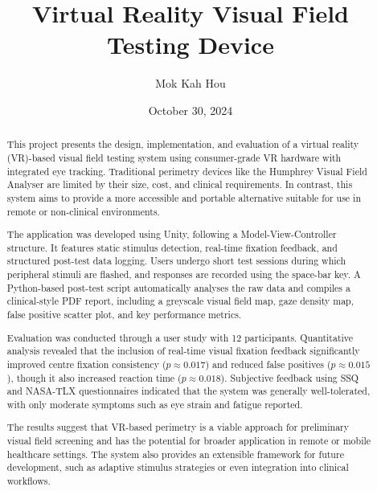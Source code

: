 \documentclass{l4proj}
\begin{document}
\title{Virtual Reality Visual Field Testing Device} %
\author{Mok Kah Hou}
\date{October 30, 2024}

\maketitle

\begin{abstract}
    This project presents the design, implementation, and evaluation of a virtual reality (VR)-based visual field testing system using consumer-grade VR hardware with integrated eye tracking. Traditional perimetry devices like the Humphrey Visual Field Analyser are limited by their size, cost, and clinical requirements. In contrast, this system aims to provide a more accessible and portable alternative suitable for use in remote or non-clinical environments.

    The application was developed using Unity, following a Model-View-Controller structure. It features static stimulus detection, real-time fixation feedback, and structured post-test data logging. Users undergo short test sessions during which peripheral stimuli are flashed, and responses are recorded using the space-bar key. A Python-based post-test script automatically analyses the raw data and compiles a clinical-style PDF report, including a greyscale visual field map, gaze density map, false positive scatter plot, and key performance metrics.
    
    Evaluation was conducted through a user study with 12 participants. Quantitative analysis revealed that the inclusion of real-time visual fixation feedback significantly improved centre fixation consistency ($p \approx 0.017$) and reduced false positives ($p \approx 0.015$), though it also increased reaction time ($p \approx 0.018$). Subjective feedback using SSQ and NASA-TLX questionnaires indicated that the system was generally well-tolerated, with only moderate symptoms such as eye strain and fatigue reported.
    
    The results suggest that VR-based perimetry is a viable approach for preliminary visual field screening and has the potential for broader application in remote or mobile healthcare settings. The system also provides an extensible framework for future development, such as adaptive stimulus strategies or even integration into clinical workflows.

\end{abstract}
\end{document}
